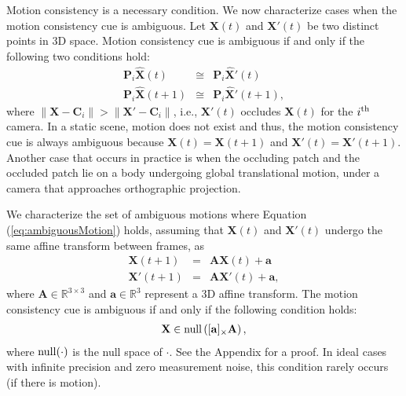 \documentclass[10pt,twocolumn,letterpaper]{article}
\begin{document}
Motion consistency is a necessary condition. We now characterize cases when the motion consistency cue is ambiguous. Let $\mathbf{X}(t)$ and $\mathbf{X}'(t)$ be two distinct points in 3D space. Motion consistency cue is ambiguous if and only if the following two conditions hold:
\begin{eqnarray}
\mathbf{P}_i {\widehat{\mathbf{X}}}(t)&\cong&\mathbf{P}_i {\widehat{\mathbf{X}}'}(t)\label{Eq:projection1}  \nonumber \\
\mathbf{P}_i {\widehat{\mathbf{X}}}(t+1)&\cong&\mathbf{P}_i {\widehat{\mathbf{X}}'}(t+1)\label{Eq:projection2},
\label{eq:ambiguousMotion}
\end{eqnarray}
where $\| \mathbf{X} - \mathbf{C}_i \| > \| \mathbf{X'} - \mathbf{C}_i \|$, i.e., $\mathbf{X}'(t)$ occludes $\mathbf{X}(t)$ for the $i^{\rm th}$ camera.
In a static scene, motion does not exist and thus, the motion consistency cue is always ambiguous because $\mathbf{X}(t) = \mathbf{X}(t+1)$ and $\mathbf{X'}(t) = \mathbf{X'}(t+1)$. Another case that occurs in practice is when the occluding patch and the occluded patch lie on a body undergoing global translational motion, under a camera that approaches orthographic projection. 

We characterize the set of ambiguous motions where Equation (\ref{eq:ambiguousMotion}) holds, assuming that $\mathbf{X}(t)$ and $\mathbf{X}'(t)$ undergo the same affine transform between frames, as 
\begin{eqnarray}
\mathbf{X}(t+1)&=&\mathbf{A} \mathbf{X}(t) +  \mathbf{a} \label{Eq:transform1}  \nonumber \\
\mathbf{X'}(t+1)&=&\mathbf{A} \mathbf{X'}(t) + \mathbf{a} \label{Eq:transform2}, 
\end{eqnarray}
where $\mathbf{A} \in \mathds{R}^{3 \times 3}$ and  $\mathbf{a} \in \mathds{R}^{3}$ represent a 3D affine transform. The motion consistency cue is ambiguous if and only if the following condition holds:
\begin{eqnarray}
\mathbf{X} \in {\rm null}\left( [\mathbf{a}]_{\times} \mathbf{A} \right), \label{Eq:nullspace}  
\end{eqnarray}
where ${\rm null}(\cdot)$ is the null space of $\cdot$. See the Appendix for a proof. In ideal cases with infinite precision and zero measurement noise, this condition rarely occurs (if there is motion).
\end{document}
